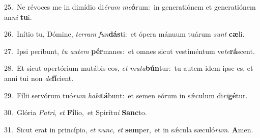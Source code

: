 {\numbfont\textcolor{\numbcolor}{25.}}~Ne révoces me in dimídio di\-\textit{é}\-\textit{rum} \textit{me}\-\textbf{ó}rum:~\star in generatiónem et generatiónem an\textit{ni} \textbf{tu}\-i.\par
{\numbfont\textcolor{\numbcolor}{26.}}~Inítio tu, Dómine, \textit{ter}\-\textit{ram} \textit{fun}\-\textbf{dás}ti:~\star et ópera mánuum tuárum \textit{sunt} \textbf{cæ}\-li.\par
{\numbfont\textcolor{\numbcolor}{27.}}~Ipsi períbunt, \textit{tu} \textit{au}\-\textit{tem} \textbf{pér}\-manes:~\star et omnes sicut vestiméntum ve\-\textit{te}\-\textbf{rá}scent.\par
{\numbfont\textcolor{\numbcolor}{28.}}~Et sicut opertórium mutábis eos, \textit{et} \textit{mu}\-\textit{ta}\textbf{bún}tur:~\star tu autem idem ipse es, et anni tui non \textit{de}\-\textbf{fí}cient.\par
{\numbfont\textcolor{\numbcolor}{29.}}~Fílii servórum tuó\textit{rum} \textit{ha}\-\textit{bi}\textbf{tá}bunt:~\star et semen eórum in sǽculum di\-\textit{ri}\-\textbf{gé}tur.\par
{\numbfont\textcolor{\numbcolor}{30.}}~Glória \textit{Pa}\-\textit{tri}, \textit{et} \textbf{Fí}\-lio,~\star et Spirítu\textit{i} \textbf{Sanc}\-to.\par
{\numbfont\textcolor{\numbcolor}{31.}}~Sicut erat in princípio, \textit{et} \textit{nunc}\-, \textit{et} \textbf{sem}\-per,~\star et in sǽcula sæculó\-\textit{rum}\-. \textbf{A}\-men.\par
